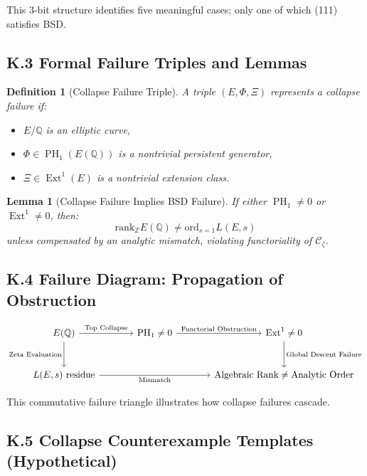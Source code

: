 \documentclass[11pt]{article}
\newtheorem{definition}[theorem]{Definition}
\newtheorem{lemma}[theorem]{Lemma}
\DeclareMathOperator{\Ext}{Ext}
\DeclareMathOperator{\PH}{PH}
\newcommand{\QQ}{\mathbb{Q}}
\newcommand{\ZZ}{\mathbb{Z}}
\begin{document}
This 3-bit structure identifies five meaningful cases; only one of which (111) satisfies BSD.

\subsection*{K.3 Formal Failure Triples and Lemmas}

\begin{definition}[Collapse Failure Triple]
A triple $(E, \Phi, \Xi)$ represents a collapse failure if:
\begin{itemize}
  \item $E/\QQ$ is an elliptic curve,
  \item $\Phi \in \PH_1(E(\QQ))$ is a nontrivial persistent generator,
  \item $\Xi \in \Ext^1(E)$ is a nontrivial extension class.
\end{itemize}
\end{definition}

\begin{lemma}[Collapse Failure Implies BSD Failure]
If either $\PH_1 \neq 0$ or $\Ext^1 \neq 0$, then:
\[
\mathrm{rank}_{\ZZ} E(\QQ) \neq \mathrm{ord}_{s=1} L(E,s)
\]
unless compensated by an analytic mismatch, violating functoriality of $\mathcal{C}_\zeta$.
\end{lemma}

\subsection*{K.4 Failure Diagram: Propagation of Obstruction}

\[
\begin{tikzcd}[row sep=large, column sep=large]
E(\QQ) \arrow[r, "\text{Top Collapse}"] \arrow[d, swap, "\text{Zeta Evaluation}"]
& \PH_1 \neq 0 \arrow[r, "\text{Functorial Obstruction}"]
& \Ext^1 \neq 0 \arrow[d, "\text{Global Descent Failure}"] \\
L(E,s)\ \text{residue} \arrow[rr, swap, "\text{Mismatch}"]
&& \text{Algebraic Rank} \neq \text{Analytic Order}
\end{tikzcd}
\]

This commutative failure triangle illustrates how collapse failures cascade.

\subsection*{K.5 Collapse Counterexample Templates (Hypothetical)}
\end{document}
